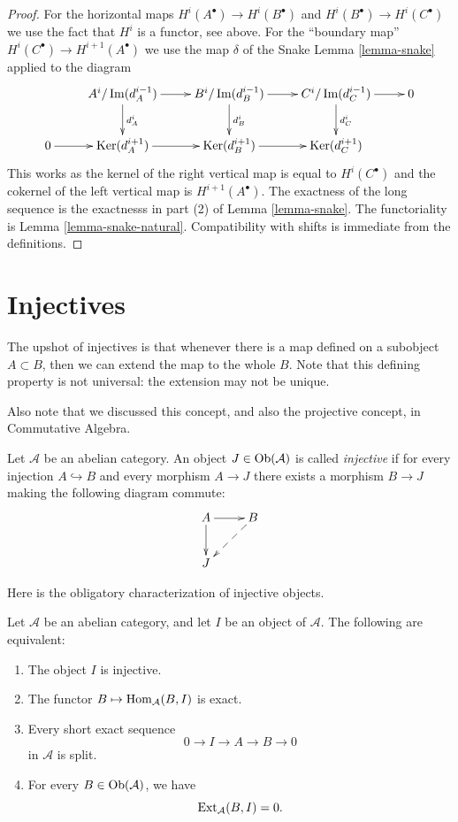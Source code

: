 \begin{proof}
For the horizontal maps $H^i(A^\bullet) \to
H^i(B^\bullet)$ and
$H^i(B^\bullet) \to H^i(C^\bullet)$ we use
the fact that $H^i$
is a functor, see above. For the ``boundary
map''
$H^i(C^\bullet) \to H^{i + 1}(A^\bullet)$ we
use the map $\delta$
of the Snake Lemma \ref{lemma-snake}
applied to the diagram
$$
\xymatrix{
&
A^i/\Im(d_A^{i - 1}) \ar[r] \ar[d]^{d_A^i} &
B^i/\Im(d_B^{i - 1}) \ar[r] \ar[d]^{d_B^i} &
C^i/\Im(d_C^{i - 1}) \ar[r] \ar[d]^{d_C^i} &
0 \\
0 \ar[r] &
\Ker(d_A^{i + 1}) \ar[r] &
\Ker(d_B^{i + 1}) \ar[r] &
\Ker(d_C^{i + 1}) &
}
$$
This works as the kernel of the right
vertical map is equal to
$H^i(C^\bullet)$ and the cokernel of the left
vertical map is
$H^{i + 1}(A^\bullet)$. The exactness of the
long sequence is
the exactnesss in part (2) of Lemma
\ref{lemma-snake}.
The functoriality is Lemma
\ref{lemma-snake-natural}. Compatibility
with shifts is immediate from the
definitions.
\end{proof}


\section{Injectives}
\label{section-injectives}

\noindent
The upshot of injectives is
that whenever there is a map
defined on a subobject $A \subset B$,
then we can extend the map to the whole $B$.
Note that this defining property is not
universal: the extension may not be unique.

Also note that we discussed this concept,
and also the projective concept,
in Commutative Algebra.

\begin{definition}
\label{definition-injective}
Let $\mathcal{A}$ be an abelian category.
An object $J \in \mathop{\mathrm{Ob}}\nolimits(\mathcal{A})$ is
called {\it injective} if for every
injection $A \hookrightarrow B$ and every
morphism $A \to J$ there exists a morphism
$B \to J$ making the following diagram
commute:
$$
\xymatrix{
A \ar[r] \ar[d] &
B \ar@{-->}[ld] \\
J &
}
$$
\end{definition}

\noindent
Here is the obligatory characterization of
injective objects.

\begin{lemma}
\label{lemma-characterize-injectives}
Let $\mathcal{A}$ be an abelian category,
and let $I$ be an object of $\mathcal{A}$.
The following are equivalent:
\begin{enumerate}
\item The object $I$ is injective.
\item The functor
$B \mapsto \mathop{\mathrm{Hom}}\nolimits_\mathcal{A}(B,I)$ is exact.
\item Every short exact sequence
$$
0 \to I \to A \to B \to 0
$$
in $\mathcal{A}$ is split.
\item For every
$B \in \mathop{\mathrm{Ob}}\nolimits(\mathcal{A})$, we have
$$
\mathop{\mathrm{Ext}}\nolimits_\mathcal{A}(B,I)=0.
$$
\end{enumerate}
\end{lemma}

